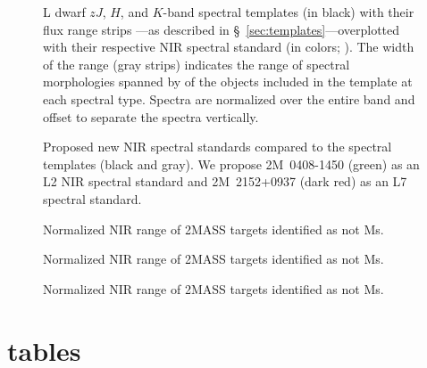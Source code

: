 \documentclass[12pt,preprint]{aastex}
\begin{document}
\clearpage

\begin{figure}
		\caption{
	L dwarf $zJ$, $H$, and $K$-band spectral templates (in black) with their flux range strips ---as described in \S~\ref{sec:templates}---overplotted with their respective NIR spectral standard (in colors; \cite{Kirkpatrick10}). 
	The width of the range (gray strips) indicates the range of spectral morphologies spanned by of the objects included in the template at each spectral type.
	Spectra are normalized over the entire band and offset to separate the spectra vertically.
	}
	\label{fig:templates-stds}
\end{figure}

\begin{figure}
		\caption{Proposed new NIR spectral standards compared to the spectral templates (black and gray).
		We propose 2M~0408-1450 (green) as an L2 NIR spectral standard and 2M~2152+0937 (dark red) as an L7 spectral standard.
		}
	\label{fig:templates-newstds}
\end{figure}


\begin{figure}
	\caption{Normalized NIR range of 2MASS targets identified as not Ms.}
	\label{fig:notMs_1}
\end{figure}

\begin{figure}
	\caption{Normalized NIR range of 2MASS targets identified as not Ms.}
\end{figure}

\begin{figure}
	\caption{Normalized NIR range of 2MASS targets identified as not Ms.}
\end{figure}

\clearpage

\section{tables}
\end{document}
